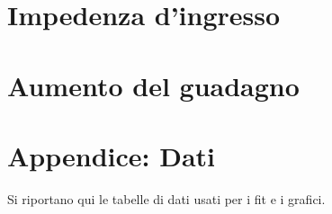 \documentclass[10pt,a4paper]{article}
\begin{document}
\section{Impedenza d'ingresso}

\section{Aumento del guadagno}

\pagebreak
\section{Appendice: Dati}
Si riportano qui le tabelle di dati usati per i fit e i grafici.

\begin{figure}[h]
	\centering
	\begin{minipage}[c]{0.4\textwidth}
		\centering
		\label{njfet}
	\end{minipage}
	\begin{minipage}[c]{0.4\textwidth}
		\centering
		\label{}
	\end{minipage}
\end{figure}
\end{document}
